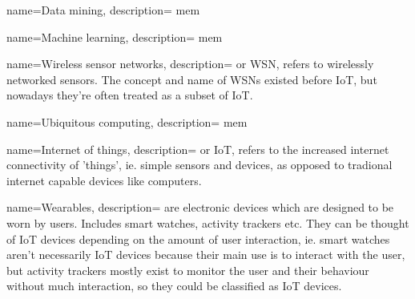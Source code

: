 
\makeglossaries{}

{
  name=Data mining,
    description={
      mem
    }
}

{
  name=Machine learning,
    description={
      mem
    }
}

{
  name=Wireless sensor networks,
    description={
      or WSN, refers to wirelessly networked sensors. The concept and name of
        WSNs existed before IoT, but nowadays they're often treated as a subset
        of IoT.
    }
}

{
  name=Ubiquitous computing,
    description={
      mem
    }
}

{
  name=Internet of things,
    description={
      or IoT, refers to the increased internet
        connectivity of 'things', ie. simple sensors and devices, as
        opposed to tradional internet capable devices like computers.
    }
}

{
  name=Wearables,
    description={
      are electronic devices which are designed to be worn by users. Includes smart
        watches, activity trackers etc. They can be thought of IoT devices
        depending on the amount of user interaction, ie. smart watches aren't
        necessarily IoT devices because their main use is to interact with the
        user, but activity trackers mostly exist to monitor the user and their
        behaviour without much interaction, so they could be classified as IoT
        devices.
    }
}
